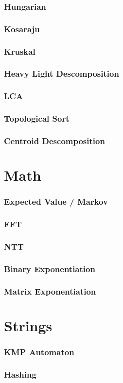 \documentclass[12pt, a4paper]{report}
\let\oldsection\section
\renewcommand{\section}{\clearpage\oldsection}
\begin{document}
\section{Hungarian}

\section{Kosaraju}

\section{Kruskal}

\section{Heavy Light Descomposition}

\section{LCA}

\section{Topological Sort}

\section{Centroid Descomposition}




\part{Math}
\setcounter{section}{0}
\section{Expected Value / Markov}

\section{FFT}

\section{NTT}

\section{Binary Exponentiation}

\section{Matrix Exponentiation}


\part{Strings}
\setcounter{section}{0}
\section{KMP Automaton}

\section{Hashing}

\end{document}
